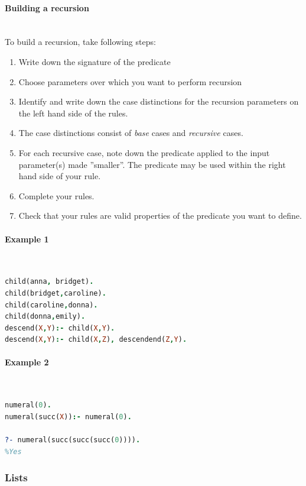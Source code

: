 \paragraph{Building a recursion} \hfill \\

To build a recursion, take following steps:

\begin{enumerate}
	\item Write down the signature of the predicate
	\item Choose parameters over which you want to perform recursion
	\item Identify and write down the case distinctions for the recursion parameters on the left hand side of the rules.
	\item The case distinctions consist of \emph{base} cases and \emph{recursive} cases.
	\item For each recursive case, note down the predicate applied to the input parameter(s) made ''smaller''. The predicate may be used within the right hand side of your rule.
	\item Complete your rules.
	\item Check that your rules are valid properties of the predicate you want to define.
\end{enumerate}

\paragraph{Example 1} \hfill \\

\begin{lstlisting}[language=Prolog]
child(anna, bridget).
child(bridget,caroline).
child(caroline,donna).
child(donna,emily).
descend(X,Y):- child(X,Y).
descend(X,Y):- child(X,Z), descendend(Z,Y).
\end{lstlisting}

\paragraph{Example 2} \hfill \\

\begin{lstlisting}[language=Prolog]
numeral(0).
numeral(succ(X)):- numeral(0).

?- numeral(succ(succ(succ(0)))).
%Yes
\end{lstlisting}

\subsubsection{Lists}

